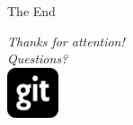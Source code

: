 \documentclass{beamer}
\begin{document}
\begin{frame}{The End}
\begin{center}
  \vspace{-2em}
  \emph{Thanks for attention!}\\
  \vspace{1em}
  \emph{Questions?}\\
  \vspace{2em}
  \href{https://github.com/aelyasov/JSDomTest}{\includegraphics[height=1.5cm,keepaspectratio]{pict/logo/git}}%
\end{center}
\end{frame}
\end{document}
